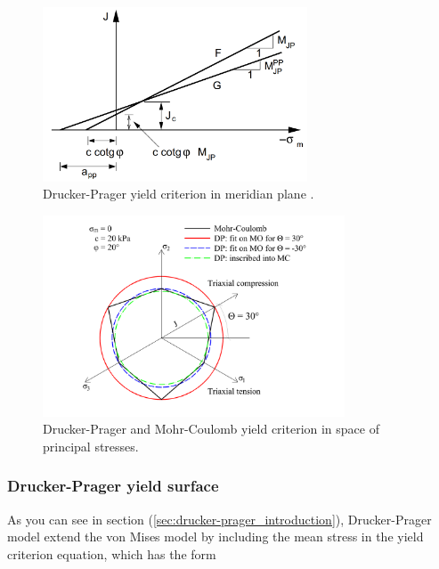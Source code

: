\begin{figure}[h!]
	\centering	
	\includegraphics[width=0.7\textwidth, angle=0]{obrazky/drucker_prager_meridian.png}
	\caption[Drucker-Prager yield criterion on meridian plane $T$]{Drucker-Prager yield criterion in meridian plane \cite{geofem}.} \label{obr:M1}
\end{figure}

\begin{figure}[h!]
	\centering	
	\includegraphics[width=0.8\textwidth, angle=0]{obrazky/drucker-prager_eng.png}
	\caption[Drucker-Prager a Mohr-Coulomb model $T$]{Drucker-Prager and Mohr-Coulomb yield criterion in space of principal stresses. \label{obr:F1}}
\end{figure}

\subsubsection{Drucker-Prager yield surface}\label{sec:drucker-prager_yield_criterion}
\indent

As you can see in section (\ref{sec:drucker-prager_introduction}), Drucker-Prager model extend the von Mises model by including the mean stress in the yield criterion equation, which has the form  

